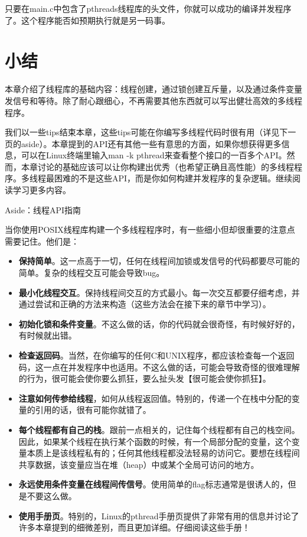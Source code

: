 只要在main.c中包含了pthreads线程库的头文件，你就可以成功的编译并发程序了。这个程序能否如预期执行就是另一码事。

\section{小结}
本章介绍了线程库的基础内容：线程创建，通过锁创建互斥量，以及通过条件变量发信号和等待。除了耐心跟细心，不再需要其他东西就可以写出健壮高效的多线程程序。

我们以一些tips结束本章，这些tips可能在你编写多线程代码时很有用（详见下一页的aside）。本章提到的API还有其他一些有意思的方面，如果你想获得更多信息，可以在Linux终端里输入man -k pthread来查看整个接口的一百多个API。然而，本章讨论的基础应该可以让你构建出优秀（也希望正确且高性能）的多线程程序。多线程最困难的不是这些API，而是你如何构建并发程序的复杂逻辑。继续阅读学习更多内容。

\begin{tcolorbox}[colframe=grey,colback= grey,arc=0pt,left=6pt,right=6pt,top=6pt,bottom=6pt,boxsep=0pt]
\begin{center}Aside：线程API指南
\end{center}
当你使用POSIX线程库构建一个多线程程序时，有一些细小但却很重要的注意点需要记住。他们是：

\begin{itemize}
\item \textbf{保持简单}。这一点高于一切，任何在线程间加锁或发信号的代码都要尽可能的简单。复杂的线程交互可能会导致bug。
\item \textbf{最小化线程交互}。保持线程间交互的方式最小。每一次交互都要仔细考虑，并通过尝试和正确的方法来构造（这些方法会在接下来的章节中学习）。

\item \textbf{初始化锁和条件变量}。不这么做的话，你的代码就会很奇怪，有时候好好的，有时候就出错。

\item \textbf{检查返回码}。当然，在你编写的任何C和UNIX程序，都应该检查每一个返回码，这一点在并发程序中也适用。不这么做的话，可能会导致奇怪的很难理解的行为，很可能会使你要么抓狂，要么扯头发【很可能会使你抓狂】。

\item \textbf{注意如何传参给线程}，如何从线程返回值。特别的，传递一个在栈中分配的变量的引用的话，很有可能你就错了。

\item \textbf{每个线程都有自己的栈}。跟前一点相关的，记住每个线程都有自己的栈空间。因此，如果某个线程在执行某个函数的时候，有一个局部分配的变量，这个变量本质上是该线程私有的；任何其他线程都没法轻易的访问它。要想在线程间共享数据，该变量应当在堆（heap）中或某个全局可访问的地方。

\item \textbf{永远使用条件变量在线程间传信号}。使用简单的flag标志通常是很诱人的，但是不要这么做。

\item \textbf{使用手册页}。特别的，Linux的pthread手册页提供了非常有用的信息并讨论了许多本章提到的细微差别，而且更加详细。仔细阅读这些手册！
\end{itemize}
\end{tcolorbox}

